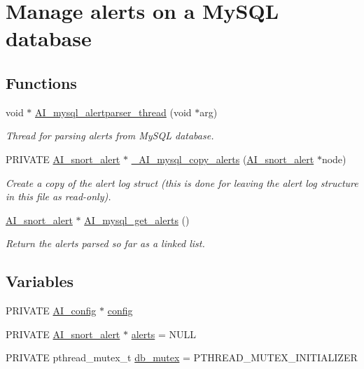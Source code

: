 \hypertarget{group__mysql}{
\section{Manage alerts on a MySQL database}
\label{group__mysql}
}
\subsection*{Functions}
\begin{DoxyCompactItemize}
\item 
void $\ast$ \hyperlink{group__mysql_gadf275635641f88725930de208fb5523f}{AI\_\-mysql\_\-alertparser\_\-thread} (void $\ast$arg)
\begin{DoxyCompactList}\small\item\em Thread for parsing alerts from MySQL database. \item\end{DoxyCompactList}\item 
PRIVATE \hyperlink{struct__AI__snort__alert}{AI\_\-snort\_\-alert} $\ast$ \hyperlink{group__mysql_gab14c269b1187da75d35d4af3eb70a302}{\_\-AI\_\-mysql\_\-copy\_\-alerts} (\hyperlink{struct__AI__snort__alert}{AI\_\-snort\_\-alert} $\ast$node)
\begin{DoxyCompactList}\small\item\em Create a copy of the alert log struct (this is done for leaving the alert log structure in this file as read-\/only). \item\end{DoxyCompactList}\item 
\hyperlink{struct__AI__snort__alert}{AI\_\-snort\_\-alert} $\ast$ \hyperlink{group__mysql_ga0ead3c1e46063e215168e76d7999d65b}{AI\_\-mysql\_\-get\_\-alerts} ()
\begin{DoxyCompactList}\small\item\em Return the alerts parsed so far as a linked list. \item\end{DoxyCompactList}\end{DoxyCompactItemize}
\subsection*{Variables}
\begin{DoxyCompactItemize}
\item 
PRIVATE \hyperlink{structAI__config}{AI\_\-config} $\ast$ \hyperlink{group__mysql_ga6439d32dccbbc77c9b2aad04897bfa74}{config}
\item 
PRIVATE \hyperlink{struct__AI__snort__alert}{AI\_\-snort\_\-alert} $\ast$ \hyperlink{group__mysql_gae837fc04e61c0eb052f997c54b4fd9fe}{alerts} = NULL
\item 
PRIVATE pthread\_\-mutex\_\-t \hyperlink{group__mysql_ga40bb4c7d0679e36cc0ec4fa41d36d96c}{db\_\-mutex} = PTHREAD\_\-MUTEX\_\-INITIALIZER
\end{DoxyCompactItemize}


